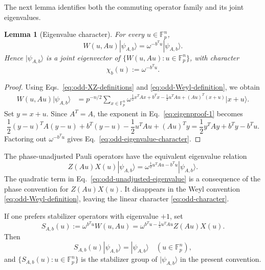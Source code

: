 \documentclass[11pt]{article}
\newcommand{\F}{\mathbb F}
\newcommand{\1}{\mathbf 1}
\theoremstyle{plain}
\newtheorem{lemma}[theorem]{Lemma}
\theoremstyle{definition}
\theoremstyle{remark}
\begin{document}
The next lemma identifies both the commuting operator family and its
joint eigenvalues.

\begin{lemma}[Eigenvalue character]
\label{lem:odd-eigenvalue-character}
For every $u\in\F_p^n$,
\begin{equation}
  W(u,Au)|\psi_{A,b}\rangle
  =\omega^{-b^Tu}|\psi_{A,b}\rangle.
  \label{eq:odd-eigenvalue-character}
\end{equation}
Hence $|\psi_{A,b}\rangle$ is a joint eigenvector of
$\{W(u,Au):u\in\F_p^n\}$, with character
\begin{equation}
  \chi_b(u):=\omega^{-b^Tu}.
  \label{eq:odd-character}
\end{equation}
\end{lemma}

\begin{proof}
Using Eqs.~\eqref{eq:odd-XZ-definitions} and
\eqref{eq:odd-Weyl-definition}, we obtain
\begin{align}
  W(u,Au)|\psi_{A,b}\rangle
  &={p^{-n/2}}
    \sum_{x\in\F_p^n}
    \omega^{\frac12x^TAx+b^Tx-\frac12u^TAu+(Au)^T(x+u)}
    |x+u\rangle.                                          \label{eq:eigenproof-1}
\end{align}
Set $y=x+u$.  Since $A^T=A$, the exponent in
Eq.~\eqref{eq:eigenproof-1} becomes
\begin{equation}
  \frac12(y-u)^TA(y-u)+b^T(y-u)-\frac12u^TAu+(Au)^Ty
  =\frac12y^TAy+b^Ty-b^Tu.
  \label{eq:eigenproof-exponent}
\end{equation}
Factoring out $\omega^{-b^Tu}$ gives
Eq.~\eqref{eq:odd-eigenvalue-character}.
\end{proof}

The phase-unadjusted Pauli operators have the equivalent eigenvalue relation
\begin{equation}
  Z(Au)X(u)|\psi_{A,b}\rangle
  =\omega^{\frac12u^TAu-b^Tu}|\psi_{A,b}\rangle.
  \label{eq:odd-unadjusted-eigenvalue}
\end{equation}
The quadratic term in Eq.~\eqref{eq:odd-unadjusted-eigenvalue} is a consequence
of the phase convention for $Z(Au)X(u)$.  It disappears in the Weyl convention
\eqref{eq:odd-Weyl-definition}, leaving the linear character
\eqref{eq:odd-character}.

If one prefers stabilizer operators with eigenvalue $+1$, set
\begin{equation}
  S_{A,b}(u)
  :=\omega^{b^Tu}W(u,Au)
  =\omega^{b^Tu-\frac12u^TAu}Z(Au)X(u).
  \label{eq:odd-plus-one-stabilizer}
\end{equation}
Then
\begin{equation}
  S_{A,b}(u)|\psi_{A,b}\rangle=|\psi_{A,b}\rangle
  \quad (u\in\F_p^n),
  \label{eq:odd-plus-one-property}
\end{equation}
and $\{S_{A,b}(u):u\in\F_p^n\}$ is the stabilizer group of
$|\psi_{A,b}\rangle$ in the present convention.
\end{document}
